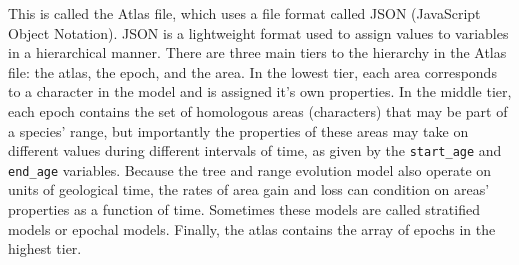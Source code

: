 
This is called the Atlas file, which uses a file format called JSON (JavaScript Object Notation).
JSON is a lightweight format used to assign values to variables in a hierarchical manner.
There are three main tiers to the hierarchy in the Atlas file: the atlas, the epoch, and the area.
In the lowest tier, each area corresponds to a character in the model and is assigned it's own properties.
In the middle tier, each epoch contains the set of homologous areas (characters) that may be part of a species' range, but importantly the properties of these areas may take on different values during different intervals of time, as given by the {\tt start\_age} and {\tt end\_age} variables.
Because the tree and range evolution model also operate on units of geological time, the rates of area gain and loss can condition on areas' properties as a function of time.
Sometimes these models are called stratified models or epochal models.
Finally, the atlas contains the array of epochs in the highest tier.

